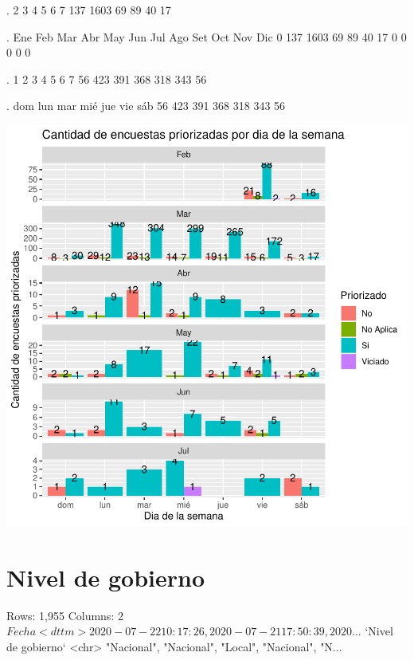\documentclass{article}
\begin{document}
\begin{Schunk}
\begin{Soutput}
.
   2    3    4    5    6    7 
 137 1603   69   89   40   17 
\end{Soutput}
\begin{Soutput}
.
 Ene  Feb  Mar  Abr  May  Jun  Jul  Ago  Set  Oct  Nov  Dic 
   0  137 1603   69   89   40   17    0    0    0    0    0 
\end{Soutput}
\begin{Soutput}
.
  1   2   3   4   5   6   7 
 56 423 391 368 318 343  56 
\end{Soutput}
\begin{Soutput}
.
dom lun mar mié jue vie sáb 
 56 423 391 368 318 343  56 
\end{Soutput}
\end{Schunk}
\includegraphics{seguimientov4-010}


\section{Nivel de gobierno}

\begin{Schunk}
\begin{Soutput}
Rows: 1,955
Columns: 2
$ Fecha               <dttm> 2020-07-22 10:17:26, 2020-07-21 17:50:39, 2020...
$ `Nivel de gobierno` <chr> "Nacional", "Nacional", "Local", "Nacional", "N...
\end{Soutput}
\end{Schunk}
\end{document}
